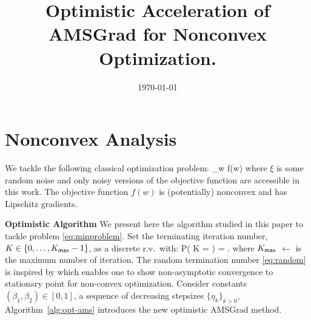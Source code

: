 \documentclass[11pt]{article}
\theoremstyle{k}
\begin{document}
\title{Optimistic Acceleration of AMSGrad for Nonconvex Optimization.}
\date{\today}

\maketitle


\section{Nonconvex Analysis}
We tackle the following classical optimization problem:
\beq\label{eq:minproblem}
\min \limits_{w \in \Theta} f(w) \eqdef \EE[ f(w, \xi)]
\eeq
where $\xi$ is some random noise and only noisy versions of the objective function are accessible in this work.
The objective function $f(w)$ is (potentially) nonconvex and has Lipschitz gradients.

\textbf{Optimistic Algorithm}
We present here the algorithm studied in this paper to tackle problem \eqref{eq:minproblem}.
Set the terminating iteration number, $K \in \{0,\dots,K_{\sf max}-1\}$, as a discrete r.v.~with:
\beq \label{eq:random}
   P( K = \ell ) = .
\eeq
where $K_{\sf max}$ $\leftarrow$ is the maximum number of iteration.
The random termination number \eqref{eq:random} is inspired by \citep{ghadimi2013stochastic} which enables one to show non-asymptotic convergence to stationary point for non-convex optimization. 
Consider constants $(\beta_1, \beta_2) \in [0,1]$, a sequence of decreasing stepsizes $\{\eta_k\}_{k>0}$, Algorithm~\ref{alg:opt-ams} introduces the new optimistic AMSGrad method.
\end{document}

